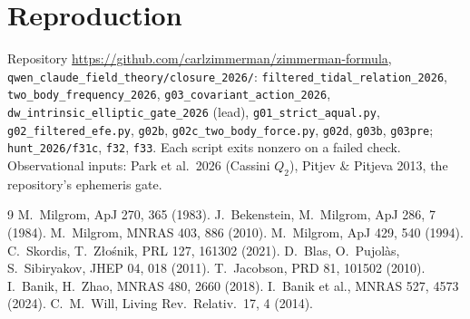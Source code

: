 \documentclass[11pt,letterpaper]{article}
\begin{document}
\section*{Reproduction}
Repository \href{https://github.com/carlzimmerman/zimmerman-formula}{https://github.com/carlzimmerman/zimmerman-formula}, \texttt{qwen\_claude\_field\_theory/closure\_2026/}: \texttt{filtered\_tidal\_relation\_2026}, \texttt{two\_body\_frequency\_2026}, \texttt{g03\_covariant\_action\_2026}, \texttt{dw\_intrinsic\_elliptic\_gate\_2026} (lead), \texttt{g01\_strict\_aqual.py}, \texttt{g02\_filtered\_efe.py}, \texttt{g02b}, \texttt{g02c\_two\_body\_force.py}, \texttt{g02d}, \texttt{g03b}, \texttt{g03pre}; \texttt{hunt\_2026/f31c}, \texttt{f32}, \texttt{f33}. Each script exits nonzero on a failed check. Observational inputs: Park et al.\ 2026 (Cassini $Q_2$), Pitjev \& Pitjeva 2013, the repository's ephemeris gate.
\begin{thebibliography}{9}\small
{} M.\ Milgrom, ApJ 270, 365 (1983).  J.\ Bekenstein, M.\ Milgrom, ApJ 286, 7 (1984).  M.\ Milgrom, MNRAS 403, 886 (2010).  M.\ Milgrom, ApJ 429, 540 (1994).
 C.\ Skordis, T.\ Złośnik, PRL 127, 161302 (2021).  D.\ Blas, O.\ Pujolàs, S.\ Sibiryakov, JHEP 04, 018 (2011).  T.\ Jacobson, PRD 81, 101502 (2010).
 I.\ Banik, H.\ Zhao, MNRAS 480, 2660 (2018).  I.\ Banik et al., MNRAS 527, 4573 (2024).  C.\ M.\ Will, Living Rev.\ Relativ.\ 17, 4 (2014).
\end{thebibliography}
\end{document}
